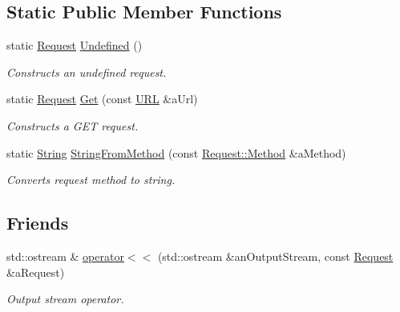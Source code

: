 \subsection*{Static Public Member Functions}
\begin{DoxyCompactItemize}
\item 
static \hyperlink{classlibrary_1_1io_1_1ip_1_1tcp_1_1http_1_1_request}{Request} \hyperlink{classlibrary_1_1io_1_1ip_1_1tcp_1_1http_1_1_request_afec9045c3213a45ac267b332ba88cad0}{Undefined} ()
\begin{DoxyCompactList}\small\item\em Constructs an undefined request. \end{DoxyCompactList}\item 
static \hyperlink{classlibrary_1_1io_1_1ip_1_1tcp_1_1http_1_1_request}{Request} \hyperlink{classlibrary_1_1io_1_1ip_1_1tcp_1_1http_1_1_request_a1625d6a461ba0aa0b1ede6af40def3bc}{Get} (const \hyperlink{classlibrary_1_1io_1_1_u_r_l}{U\+RL} \&a\+Url)
\begin{DoxyCompactList}\small\item\em Constructs a G\+ET request. \end{DoxyCompactList}\item 
static \hyperlink{namespacelibrary_1_1io_1_1ip_1_1tcp_1_1http_a1c435ea1e3614d52139da88a36632815}{String} \hyperlink{classlibrary_1_1io_1_1ip_1_1tcp_1_1http_1_1_request_a542d84054f8f60992eb71fad68663eac}{String\+From\+Method} (const \hyperlink{classlibrary_1_1io_1_1ip_1_1tcp_1_1http_1_1_request_a45baccf3aec384fbdbbf6ce411f11bd7}{Request\+::\+Method} \&a\+Method)
\begin{DoxyCompactList}\small\item\em Converts request method to string. \end{DoxyCompactList}\end{DoxyCompactItemize}
\subsection*{Friends}
\begin{DoxyCompactItemize}
\item 
std\+::ostream \& \hyperlink{classlibrary_1_1io_1_1ip_1_1tcp_1_1http_1_1_request_a73dd714a92305cf3d0b7bdba904b3fc7}{operator$<$$<$} (std\+::ostream \&an\+Output\+Stream, const \hyperlink{classlibrary_1_1io_1_1ip_1_1tcp_1_1http_1_1_request}{Request} \&a\+Request)
\begin{DoxyCompactList}\small\item\em Output stream operator. \end{DoxyCompactList}\end{DoxyCompactItemize}


